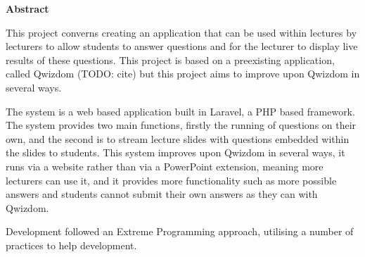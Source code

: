 \thispagestyle{empty}

\begin{center}
    {\LARGE\bf Abstract}
\end{center}

This project converns creating an application that can be used within lectures by lecturers to allow students to answer questions and for the lecturer to display live results of these questions. This project is based on a preexisting application, called Qwizdom (TODO: cite) but this project aims to improve upon Qwizdom in several ways.

The system is a web based application built in Laravel, a PHP based framework. The system provides two main functions, firstly the running of questions on their own, and the second is to stream lecture slides with questions embedded within the slides to students. This system improves upon Qwizdom in several ways, it runs via a website rather than via a PowerPoint extension, meaning more lecturers can use it, and it provides more functionality such as more possible answers and students cannot submit their own answers as they can with Qwizdom.

Development followed an Extreme Programming approach, utilising a number of practices to help development.